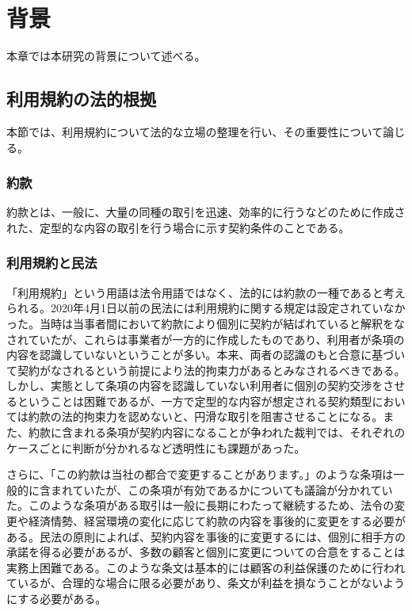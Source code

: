 \chapter{背景}
\label{background}
本章では本研究の背景について述べる。

\section{利用規約の法的根拠}
本節では、利用規約について法的な立場の整理を行い、その重要性について論じる。

\subsection{約款}
約款とは、一般に、大量の同種の取引を迅速、効率的に行うなどのために作成された、定型的な内容の取引を行う場合に示す契約条件のことである。

\subsection{利用規約と民法}
「利用規約」という用語は法令用語ではなく、法的には約款の一種であると考えられる\cite{itakura2013}。2020年4月1日以前の民法には利用規約に関する規定は設定されていなかった。当時は当事者間において約款により個別に契約が結ばれていると解釈をなされていたが、これらは事業者が一方的に作成したものであり、利用者が条項の内容を認識していないということが多い。本来、両者の認識のもと合意に基づいて契約がなされるという前提により法的拘束力があるとみなされるべきである。しかし、実態として条項の内容を認識していない利用者に個別の契約交渉をさせるということは困難であるが、一方で定型的な内容が想定される契約類型においては約款の法的拘束力を認めないと、円滑な取引を阻害させることになる。また、約款に含まれる条項が契約内容になることが争われた裁判では、それぞれのケースごとに判断が分かれるなど透明性にも課題があった\cite{hashimoto2021}。

さらに、「この約款は当社の都合で変更することがあります。」のような条項は一般的に含まれていたが、この条項が有効であるかについても議論が分かれていた。このような条項がある取引は一般に長期にわたって継続するため、法令の変更や経済情勢、経営環境の変化に応じて約款の内容を事後的に変更をする必要がある。民法の原則によれば、契約内容を事後的に変更するには、個別に相手方の承諾を得る必要があるが、多数の顧客と個別に変更についての合意をすることは実務上困難である。このような条文は基本的には顧客の利益保護のために行われているが、合理的な場合に限る必要があり、条文が利益を損なうことがないようにする必要がある\cite{moj2020minpo}。

